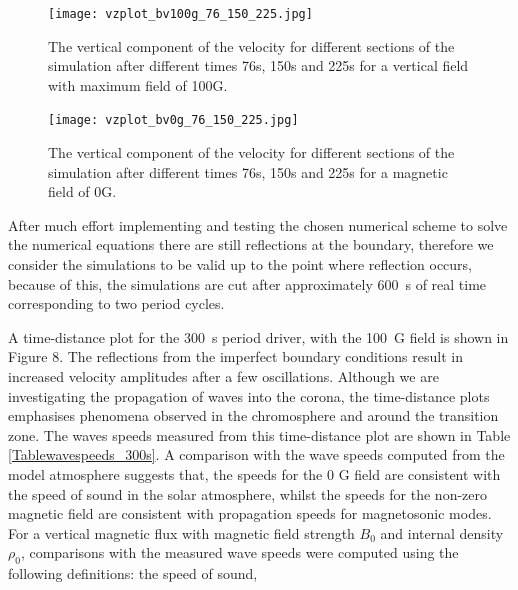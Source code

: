 \documentclass[physics,article,submit,pdftex,moreauthors]{Definitions/mdpi}
\begin{document}
\begin{figure}\label{vzplot_bv100g_76_150_225}
\texttt{[image: vzplot\_bv100g\_76\_150\_225.jpg]}
\caption{The vertical component of the velocity for different sections of the simulation after different times 76s, 150s and 225s for a vertical field with maximum field of 100G.}
\end{figure}



\begin{figure}\label{vzplot_bv0g_76_150_225}
\texttt{[image: vzplot\_bv0g\_76\_150\_225.jpg]}
\caption{The vertical component of the velocity for different sections of the simulation after different times 76s, 150s and 225s for a magnetic field of 0G.}
\end{figure}




After much  effort implementing and testing  the chosen numerical scheme to solve the numerical equations there are still reflections at the boundary, therefore we consider the simulations to be valid up to the point where reflection occurs, because of this, the simulations are cut after approximately 600~s of real time corresponding to two period cycles.

A  time-distance plot for the 300~s period driver, with the 100~G field is shown in Figure 8. The reflections from the imperfect boundary conditions result in increased velocity amplitudes after a few oscillations. Although we are investigating the propagation of waves into the corona, the time-distance plots emphasises phenomena observed in the chromosphere and around the transition zone.  The waves speeds measured from this time-distance plot are shown in Table \ref{Tablewavespeeds_300s}. A comparison with the wave speeds computed from the model atmosphere suggests that, the speeds for the 0 G field are consistent with the speed of sound in the solar atmosphere, whilst the speeds for the non-zero magnetic field are consistent with propagation speeds for magnetosonic modes.
For a  vertical magnetic flux %
with magnetic field strength $B_{0}$ and internal density $\rho_{0}$, comparisons with the measured wave speeds were computed using the following definitions:
the speed of sound,
\end{document}

